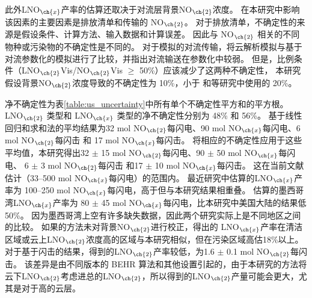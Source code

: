 此外LNO$_{\ch{x}}$产率的估算还取决于对流层背景NO$_{\ch{2}}$浓度。
在本研究中影响该因素的主要因素是排放清单和传输的 NO$_{\ch{2}}$。
对于排放清单，不确定性的来源是假设条件、计算方法、输入数据和计算误差。
因此与 NO$_{\ch{2}}$ 相关的不同物种或污染物的不确定性是不同的。
对于模拟的对流传输，\citet{Li.2018}将云解析模拟与基于对流参数化的模拟进行了比较，并指出对流输送在参数化中较弱。
但是，比例条件（LNO$_{\ch{2}}$Vis/NO$_{\ch{2}}$Vis $\geq$ 50\%）应该减少了这两种不确定性，
本研究假设背景NO$_{\ch{2}}$浓度导致的不确定性为 10\%，小于 \citet{Allen.2019}和\citet{Bucsela.2019}等研究中使用的 20\%。

净不确定性为表\ref{table:us_uncertainty}中所有单个不确定性平方和的平方根。
LNO$_{\ch{2}}$ 类型和 LNO$_{\ch{x}}$ 类型的净不确定性分别为 48\% 和 56\%。
基于线性回归和求和法的平均结果为32 mol NO$_{\ch{2}}$每闪电、90 mol NO$_{\ch{x}}$每闪电、6 mol NO$_{\ch{2}}$每闪击 和 17 mol NO$_{\ch{x}}$每闪击。
将相应的不确定性应用于这些平均值，本研究得出32 $\pm$ 15 mol NO$_{\ch{2}}$每闪电、90 $\pm$ 50 mol NO$_{\ch{x}}$每闪电、
6 $\pm$ 3 mol NO$_{\ch{2}}$每闪击 和17 $\pm$ 10 mol NO$_{\ch{x}}$每闪击。
这在当前文献估计（33--500 mol NO$_{\ch{x}}$每闪电）的范围内\citep{Schumann.2007,Beirle.2010,Bucsela.2010}。
最近\citet{Bucsela.2010}研究中估算的LNO$_{\ch{x}}$产率为 100--250 mol NO$_{\ch{x}}$每闪电，高于但与本研究结果相重叠。
\citet{Pickering.2016}估算的墨西哥湾LNO$_{\ch{x}}$产率为 80 $\pm$ 45 mol NO$_{\ch{x}}$每闪电，比本研究中美国大陆的结果低50\%。
因为墨西哥湾上空有许多缺失数据，因此两个研究实际上是不同地区之间的比较。
如果\citet{Pickering.2016}的方法未对背景NO$_{\ch{2}}$进行校正，得出的 LNO$_{\ch{x}}$产率在清洁区域或云上LNO$_{\ch{2}}$浓度高的区域与本研究相似，但在污染区域高估18\%以上。
对于基于闪击的结果，\citet{Lapierre.2020}得到的LNO$_{\ch{2}}$产率较低，为1.6 $\pm$ 0.1 mol NO$_{\ch{2}}$每闪击。
该差异是由不同版本的 BEHR 算法和其他设置引起的，由于本研究的方法将云下LNO$_{\ch{2}}$考虑进总的LNO$_{\ch{2}}$，所以得到的LNO$_{\ch{2}}$产量可能会更大，尤其是对于高的云层。

